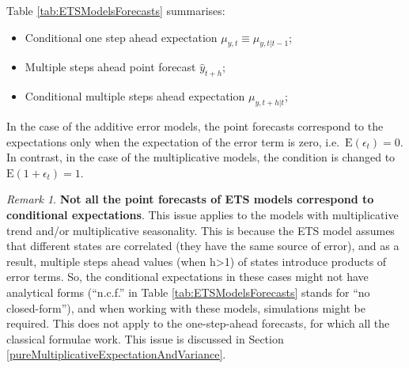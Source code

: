 \documentclass[
]{book}
\providecommand{\tightlist}{%
  \setlength{\itemsep}{0pt}\setlength{\parskip}{0pt}}
\theoremstyle{definition}
\theoremstyle{definition}
\theoremstyle{definition}
\theoremstyle{definition}
\theoremstyle{remark}
\newtheorem*{remark}{Remark}
\begin{document}
Table \ref{tab:ETSModelsForecasts} summarises:

\begin{itemize}
\tightlist
\item
  Conditional one step ahead expectation \(\mu_{y,t} \equiv \mu_{y,t|t-1}\);
\item
  Multiple steps ahead point forecast \(\hat{y}_{t+h}\);
\item
  Conditional multiple steps ahead expectation \(\mu_{y,t+h|t}\);
\end{itemize}

In the case of the additive error models, the point forecasts correspond to the expectations only when the expectation of the error term is zero, i.e.~\(\text{E}(\epsilon_t)=0\). In contrast, in the case of the multiplicative models, the condition is changed to \(\text{E}(1+\epsilon_t)=1\).

\begin{remark}
\textbf{Not all the point forecasts of ETS models correspond to conditional expectations}. This issue applies to the models with multiplicative trend and/or multiplicative seasonality. This is because the ETS model assumes that different states are correlated (they have the same source of error), and as a result, multiple steps ahead values (when h\textgreater1) of states introduce products of error terms. So, the conditional expectations in these cases might not have analytical forms (``n.c.f.'' in Table \ref{tab:ETSModelsForecasts} stands for ``no closed-form''), and when working with these models, simulations might be required. This does not apply to the one-step-ahead forecasts, for which all the classical formulae work. This issue is discussed in Section \ref{pureMultiplicativeExpectationAndVariance}.
\end{remark}
\end{document}
